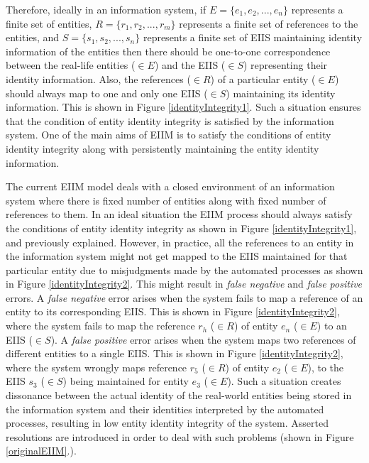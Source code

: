 Therefore, ideally in an information system, if $E = \{e_{1},e_{2}, ... ,e_{n}\}$ represents a finite set of entities, $R = \{r_{1},r_{2}, ... ,r_{m}\}$ represents a finite set of references to the entities, and $S = \{s_{1},s_{2}, ... ,s_{n}\}$ represents a finite set of EIIS maintaining identity information of the entities then there should be one-to-one correspondence between the real-life entities ($\in E$) and the EIIS ($\in S$) representing their identity information. Also, the references ($\in R$) of a particular entity ($\in E$) should always map to one and only one EIIS ($\in S$) maintaining its identity information. This is shown in Figure \ref{identityIntegrity1}. Such a situation ensures that the condition of entity identity integrity is satisfied by the information system. One of the main aims of EIIM is to satisfy the conditions of entity identity integrity along with persistently maintaining the entity identity information.

The current EIIM model deals with a closed environment of an information system where there is fixed number of entities along with fixed number of references to them. In an ideal situation the EIIM process should always satisfy the conditions of entity identity integrity as shown in Figure \ref{identityIntegrity1}, and previously explained. However, in practice, all the references to an entity in the information system might not get mapped to the EIIS maintained for that particular entity due to misjudgments made by the automated processes as shown in Figure \ref{identityIntegrity2}. This might result in \textit{false negative} and \textit{false positive} errors. A \textit{false negative} error arises when the system fails to map a reference of an entity to its corresponding EIIS. This is shown in Figure \ref{identityIntegrity2}, where the system fails to map the reference $r_{h}$ ($\in R$) of entity $e_{n}$ ($\in E$) to an EIIS ($\in S$). A \textit{false positive} error arises when the system maps two references of different entities to a single EIIS. This is shown in Figure \ref{identityIntegrity2}, where the system wrongly maps reference $r_{5}$ ($\in R$) of entity $e_{2}$ ($\in E$), to the EIIS $s_{3}$ ($\in S$) being maintained for entity $e_{3}$ ($\in E$). Such a situation creates dissonance between the actual identity of the real-world entities being stored in the information system and their identities interpreted by the automated processes, resulting in low entity identity integrity of the system. Asserted resolutions are introduced in order to deal with such problems (shown in Figure \ref{originalEIIM}.).

